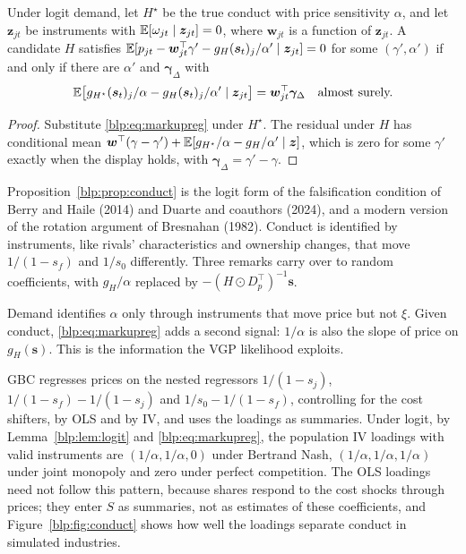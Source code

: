 \begin{proposition}\label{blp:prop:conduct}
Under logit demand, let $H^\star$ be the true conduct with price sensitivity $\alpha$, and let
$\bm z_{jt}$ be instruments with $\mathbb{E}[\omega_{jt}\mid\bm z_{jt}] = 0$, where $\bm w_{jt}$ is a
function of $\bm z_{jt}$. A candidate $H$ satisfies
$\mathbb{E}[p_{jt} - \bm w_{jt}^\top\gamma' - g_H(\bm s_t)_j/\alpha' \mid\bm z_{jt}] = 0$ for some
$(\gamma',\alpha')$ if and only if there are $\alpha'$ and $\bm\gamma_\Delta$ with
\[
\mathbb{E}\bigl[g_{H^\star}(\bm s_t)_j/\alpha - g_H(\bm s_t)_j/\alpha' \mid \bm z_{jt}\bigr]
= \bm w_{jt}^\top\bm\gamma_\Delta\quad\text{almost surely.}
\]
\end{proposition}
\begin{proof}
Substitute \eqref{blp:eq:markupreg} under $H^\star$. The residual under $H$ has conditional mean
$\bm w^\top(\gamma - \gamma') + \mathbb{E}[g_{H^\star}/\alpha - g_H/\alpha'\mid\bm z]$, which is zero for
some $\gamma'$ exactly when the display holds, with $\bm\gamma_\Delta = \gamma'-\gamma$.
\end{proof}

Proposition~\ref{blp:prop:conduct} is the logit form of the falsification condition of
Berry and Haile (2014) and Duarte and coauthors (2024), and a modern version of the rotation argument
of Bresnahan (1982). Conduct is identified by instruments, like rivals' characteristics and ownership changes, that move $1/(1-s_f)$ and $1/s_0$ differently. Three remarks carry over to random
coefficients, with $g_H/\alpha$ replaced by $-(H\odot D_p^\top)^{-1}\bm s$.

\begin{remark}
Demand identifies $\alpha$ only through instruments that move price but not $\xi$. Given conduct,
\eqref{blp:eq:markupreg} adds a second signal: $1/\alpha$ is also the slope of price on $g_H(\bm s)$.
This is the information the VGP likelihood exploits.
\end{remark}

\begin{remark}\label{blp:rem:markupreg}
GBC regresses prices on the nested regressors $1/(1-s_j)$, $1/(1-s_f)-1/(1-s_j)$ and $1/s_0 - 1/(1-s_f)$, controlling for the cost shifters, by OLS and by IV, and uses the loadings as summaries. Under logit, by Lemma~\ref{blp:lem:logit} and \eqref{blp:eq:markupreg}, the population IV loadings with valid instruments are $(1/\alpha,1/\alpha,0)$ under Bertrand Nash, $(1/\alpha,1/\alpha,1/\alpha)$ under joint monopoly and zero under perfect competition. The OLS loadings need not follow this pattern, because shares respond to the cost shocks through prices; they enter $S$ as summaries, not as estimates of these coefficients, and Figure~\ref{blp:fig:conduct} shows how well the loadings separate conduct in simulated industries.
\end{remark}


